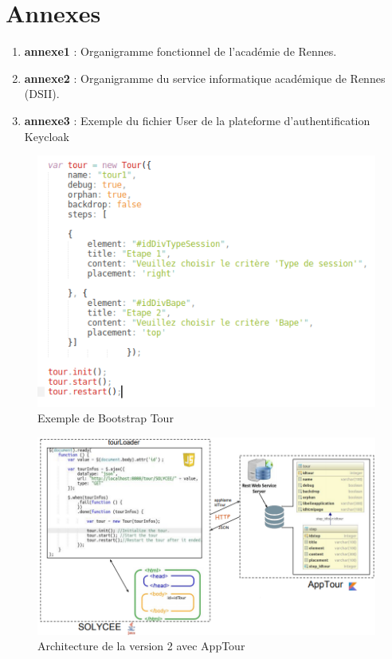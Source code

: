 \section*{\centering Annexes}
\vspace*{30px}

\begin{enumerate}
	\item \textbf{annexe1} : Organigramme fonctionnel de l'académie de Rennes.\\
	\item \textbf{annexe2} : Organigramme du service informatique académique de Rennes (DSII).\\
	\item \textbf{annexe3} : Exemple du fichier User de la plateforme d'authentification Keycloak
\end{enumerate}





\begin{figure}[H]
	\centering
 		\includegraphics[width=1\textwidth]{pdf/bootstrap_tour.png}
  		\caption{Exemple de Bootstrap Tour }
 \end{figure}
 
 
 \begin{figure}[H]
	\centering
 		\includegraphics[width=1\textwidth]{pdf/architecture.png}
  		\caption{Architecture de la version 2 avec AppTour }
 \end{figure}

\vfill

\vfill



